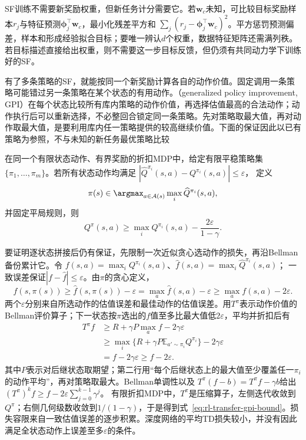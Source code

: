 SF训练不需要新奖励权重，但新任务计分需要它。若$\bm w_c$未知，可比较目标奖励样本$r_j$与特征预测$\bm\phi_j^\top\bm w_c$，最小化残差平方和
$\sum_j(r_j-\bm\phi_j^\top\bm w_c)^2$。平方惩罚预测偏差，样本和形成经验拟合目标；要唯一辨认$d$个权重，数据特征矩阵还需满列秩。若目标描述直接给出权重，则不需要这一步目标反馈，但仍须有共同动力学下训练好的SF。

有了多条策略的SF，就能按同一个新奖励计算各自的动作价值。固定调用一条策略可能错过另一条策略在某个状态的有用动作。（generalized policy improvement, GPI）在每个状态比较所有库内策略的动作价值，再选择估值最高的合法动作；动作执行后可以重新选择，不必整回合锁定同一条策略。先对策略取最大值，再对动作取最大值，是要利用库内任一策略提供的较高继续价值。下面的保证因此以已有策略为参照，不与未知的新任务最优策略比较

\begin{theorem}[有一致估计误差的广义策略改进]
 \label{thm:rl-transfer-gpi}
 在同一个有限状态动作、有界奖励的折扣MDP中，给定有限平稳策略集
 $\{\pi_1,\ldots,\pi_m\}$。若所有状态动作均满足
 $|\widehat Q^{\pi_i}(s,a)-Q^{\pi_i}(s,a)|\leq\varepsilon$，
 定义
 \[
 \pi(s)\in\argmax_{a\in\mathcal A(s)}\max_i\widehat Q^{\pi_i}(s,a),
 \]
 并固定平局规则，则
 \begin{equation}
 Q^\pi(s,a)\geq\max_iQ^{\pi_i}(s,a)
                -\frac{2\varepsilon}{1-\gamma}.
 \label{eq:rl-transfer-gpi-bound}
 \end{equation}
\end{theorem}

要证明逐状态拼接后仍有保证，先限制一次近似贪心选动作的损失，再沿Bellman备份累计它。令
$f(s,a)=\max_iQ^{\pi_i}(s,a)$、$\widehat f(s,a)=\max_i\widehat Q^{\pi_i}(s,a)$；
一致误差保证$|f-\widehat f|\leq\varepsilon$。由$\pi$的贪心定义，
\[
 f(s,\pi(s))\geq\widehat f(s,\pi(s))-\varepsilon
 =\max_a\widehat f(s,a)-\varepsilon
 \geq\max_a f(s,a)-2\varepsilon.
\]
两个$\varepsilon$分别来自所选动作的估值误差和最佳动作的估值误差。用$T^\pi$表示动作价值的Bellman评价算子；下一状态按$\pi$选出的$f$值至多比最大值低$2\varepsilon$，平均并折扣后有
\begin{align*}
 T^\pi f
 &\geq R+\gamma P\max_a f-2\gamma\varepsilon\\
 &\geq \max_i\{R+\gamma P\mathbb E_{a'\sim\pi_i}Q^{\pi_i}\}
           -2\gamma\varepsilon\\
 &=f-2\gamma\varepsilon\geq f-2\varepsilon.
\end{align*}
其中$P$表示对后继状态取期望；第二行用“每个后继状态上的最大值至少覆盖任一$\pi_i$的动作平均”，再对策略取最大。Bellman单调性以及
$T^\pi(f-b)=T^\pi f-\gamma b$给出
$(T^\pi)^k f\geq f-2\varepsilon\sum_{j=0}^{k-1}\gamma^j$。
有限折扣MDP中，$T^\pi$是压缩算子，左侧迭代收敛到$Q^\pi$；右侧几何级数收敛到$1/(1-\gamma)$，于是得到式~\eqref{eq:rl-transfer-gpi-bound}。损失容限来自一致估值误差的逐步积累。深度网络的平均TD损失较小，并没有因此满足全状态动作上误差至多$\varepsilon$的条件。

